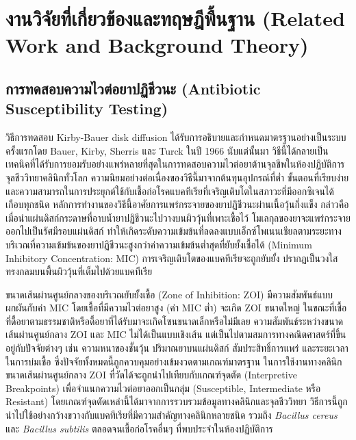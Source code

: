 \chapter{งานวิจัยที่เกี่ยวข้องและทฤษฎีพื้นฐาน (Related Work and Background Theory)}

\section{การทดสอบความไวต่อยาปฏิชีวนะ (Antibiotic Susceptibility Testing)}

วิธีการทดสอบ Kirby-Bauer disk diffusion ได้รับการอธิบายและกำหนดมาตรฐานอย่างเป็นระบบครั้งแรกโดย Bauer, Kirby, Sherris และ Turck ในปี 1966 นับแต่นั้นมา วิธีนี้ได้กลายเป็นเทคนิคที่ได้รับการยอมรับอย่างแพร่หลายที่สุดในการทดสอบความไวต่อยาต้านจุลชีพในห้องปฏิบัติการจุลชีววิทยาคลินิกทั่วโลก \cite{asm2009kirby,clsi2025} ความนิยมอย่างต่อเนื่องของวิธีนี้มาจากต้นทุนอุปกรณ์ที่ต่ำ ขั้นตอนที่เรียบง่าย และความสามารถในการประยุกต์ใช้กับเชื้อก่อโรคแบคทีเรียที่เจริญเติบโตในสภาวะที่มีออกซิเจนได้เกือบทุกชนิด หลักการทำงานของวิธีนี้อาศัยการแพร่กระจายของยาปฏิชีวนะผ่านเนื้อวุ้นกึ่งแข็ง กล่าวคือ เมื่อนำแผ่นดิสก์กระดาษที่อาบน้ำยาปฏิชีวนะไปวางบนผิววุ้นที่เพาะเชื้อไว้ โมเลกุลของยาจะแพร่กระจายออกไปเป็นรัศมีรอบแผ่นดิสก์ ทำให้เกิดระดับความเข้มข้นที่ลดลงแบบเอ็กซ์โพเนนเชียลตามระยะทาง บริเวณที่ความเข้มข้นของยาปฏิชีวนะสูงกว่าค่าความเข้มข้นต่ำสุดที่ยับยั้งเชื้อได้ (Minimum Inhibitory Concentration: MIC) การเจริญเติบโตของแบคทีเรียจะถูกยับยั้ง ปรากฏเป็นวงใสทรงกลมบนพื้นผิววุ้นที่เต็มไปด้วยแบคทีเรีย

ขนาดเส้นผ่านศูนย์กลางของบริเวณยับยั้งเชื้อ (Zone of Inhibition: ZOI) มีความสัมพันธ์แบบผกผันกับค่า MIC โดยเชื้อที่มีความไวต่อยาสูง (ค่า MIC ต่ำ) จะเกิด ZOI ขนาดใหญ่ ในขณะที่เชื้อที่ดื้อยาตามธรรมชาติหรือดื้อยาที่ได้รับมาจะเกิดโซนขนาดเล็กหรือไม่มีเลย ความสัมพันธ์ระหว่างขนาดเส้นผ่านศูนย์กลาง ZOI และ MIC ไม่ได้เป็นแบบเชิงเส้น แต่เป็นไปตามสมการทางคณิตศาสตร์ที่ขึ้นอยู่กับปัจจัยต่างๆ เช่น ความหนาของชั้นวุ้น ปริมาณยาบนแผ่นดิสก์ สัมประสิทธิ์การแพร่ และระยะเวลาในการบ่มเชื้อ ซึ่งปัจจัยทั้งหมดนี้ถูกควบคุมอย่างเข้มงวดตามเกณฑ์มาตรฐาน ในการใช้งานทางคลินิก ขนาดเส้นผ่านศูนย์กลาง ZOI ที่วัดได้จะถูกนำไปเทียบกับเกณฑ์จุดตัด (Interpretive Breakpoints) เพื่อจำแนกความไวต่อยาออกเป็นกลุ่ม (Susceptible, Intermediate หรือ Resistant) โดยเกณฑ์จุดตัดเหล่านี้ได้มาจากการรวบรวมข้อมูลทางคลินิกและจุลชีววิทยา วิธีการนี้ถูกนำไปใช้อย่างกว้างขวางกับแบคทีเรียที่มีความสำคัญทางคลินิกหลายชนิด รวมถึง \textit{Bacillus cereus} \cite{fitwi2020} และ \textit{Bacillus subtilis} \cite{jiang2023} ตลอดจนเชื้อก่อโรคอื่นๆ ที่พบประจำในห้องปฏิบัติการ

